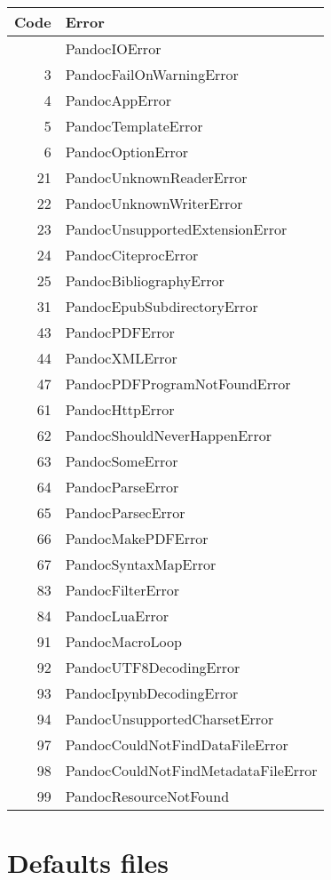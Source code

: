 \documentclass[
]{article}
\begin{document}
\begin{longtable}[]{@{}rl@{}}
\toprule\noalign{}
Code & Error \\
\midrule\noalign{}
\endhead
\bottomrule\noalign{}
\endlastfoot
1 & PandocIOError \\
3 & PandocFailOnWarningError \\
4 & PandocAppError \\
5 & PandocTemplateError \\
6 & PandocOptionError \\
21 & PandocUnknownReaderError \\
22 & PandocUnknownWriterError \\
23 & PandocUnsupportedExtensionError \\
24 & PandocCiteprocError \\
25 & PandocBibliographyError \\
31 & PandocEpubSubdirectoryError \\
43 & PandocPDFError \\
44 & PandocXMLError \\
47 & PandocPDFProgramNotFoundError \\
61 & PandocHttpError \\
62 & PandocShouldNeverHappenError \\
63 & PandocSomeError \\
64 & PandocParseError \\
65 & PandocParsecError \\
66 & PandocMakePDFError \\
67 & PandocSyntaxMapError \\
83 & PandocFilterError \\
84 & PandocLuaError \\
91 & PandocMacroLoop \\
92 & PandocUTF8DecodingError \\
93 & PandocIpynbDecodingError \\
94 & PandocUnsupportedCharsetError \\
97 & PandocCouldNotFindDataFileError \\
98 & PandocCouldNotFindMetadataFileError \\
99 & PandocResourceNotFound \\
\end{longtable}

\section{Defaults files}\label{defaults-files}
\end{document}
